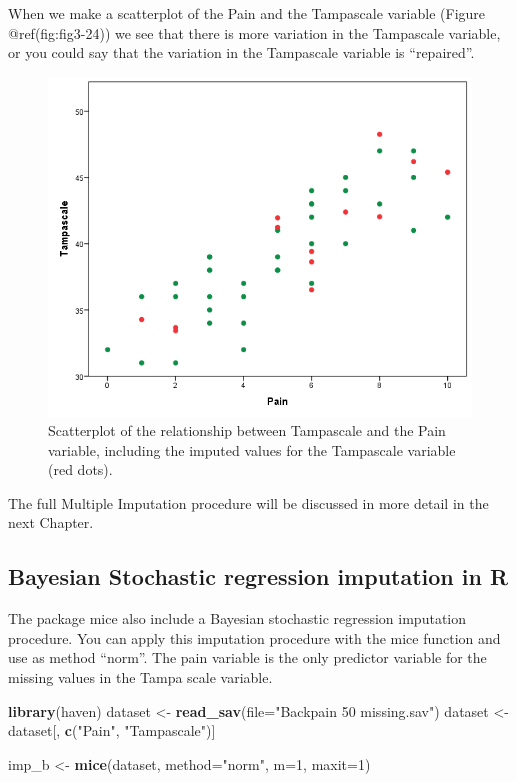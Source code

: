 \documentclass[
]{book}
\newenvironment{Shaded}{\begin{snugshade}}{\end{snugshade}}
\newcommand{\DataTypeTok}[1]{\textcolor[rgb]{0.13,0.29,0.53}{#1}}
\newcommand{\DecValTok}[1]{\textcolor[rgb]{0.00,0.00,0.81}{#1}}
\newcommand{\KeywordTok}[1]{\textcolor[rgb]{0.13,0.29,0.53}{\textbf{#1}}}
\newcommand{\NormalTok}[1]{#1}
\newcommand{\StringTok}[1]{\textcolor[rgb]{0.31,0.60,0.02}{#1}}
\begin{document}
When we make a scatterplot of the Pain and the Tampascale variable
(Figure @ref(fig:fig3-24)) we see that there is more variation in the
Tampascale variable, or you could say that the variation in the
Tampascale variable is ``repaired''.

\begin{figure}

{\centering \includegraphics[width=0.7\linewidth]{images/Fig3.24} 

}

\caption{Scatterplot of the relationship between Tampascale and the Pain variable, including the imputed values for the Tampascale variable (red dots).}\label{fig:fig3-24}
\end{figure}

The full Multiple Imputation procedure will be discussed in more detail
in the next Chapter.

\hypertarget{bayesian-stochastic-regression-imputation-in-r}{%
\subsection{Bayesian Stochastic regression imputation in
R}\label{bayesian-stochastic-regression-imputation-in-r}}

The package mice also include a Bayesian stochastic regression
imputation procedure. You can apply this imputation procedure with the
mice function and use as method ``norm''. The pain variable is the only
predictor variable for the missing values in the Tampa scale variable.

\begin{Shaded}
\begin{Highlighting}[]
\KeywordTok{library}\NormalTok{(haven)}
\NormalTok{dataset <-}\StringTok{ }\KeywordTok{read_sav}\NormalTok{(}\DataTypeTok{file=}\StringTok{"Backpain 50 missing.sav"}\NormalTok{)}
\NormalTok{dataset <-}\StringTok{ }\NormalTok{dataset[, }\KeywordTok{c}\NormalTok{(}\StringTok{"Pain"}\NormalTok{, }\StringTok{"Tampascale"}\NormalTok{)]}

\NormalTok{imp_b <-}\StringTok{ }\KeywordTok{mice}\NormalTok{(dataset, }\DataTypeTok{method=}\StringTok{"norm"}\NormalTok{, }\DataTypeTok{m=}\DecValTok{1}\NormalTok{, }\DataTypeTok{maxit=}\DecValTok{1}\NormalTok{)}
\end{Highlighting}
\end{Shaded}
\end{document}
